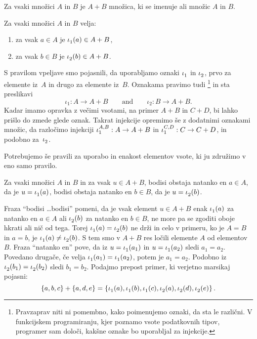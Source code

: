 \begin{pravilo}[Vsota]
  \label{vsota:tvorba}
  Za vsaki množici $A$ in $B$ je $A + B$ množica, ki se imenuje  ali
   množic $A$ in $B$.
\end{pravilo}

\begin{pravilo}
  \label{vsota:vpeljava}
  Za vsaki množici $A$ in $B$ velja:
  \begin{enumerate}
  \item za vsak $a \in A$ je $\inl(a) \in A + B$,
  \item za vsak $b \in B$ je $\inr(b) \in A + B$.
  \end{enumerate}
\end{pravilo}

S pravilom vpeljave smo pojasnili, da uporabljamo oznaki $\inl$ in $\inr$, prvo za
elemente iz~$A$ in drugo za elemente iz~$B$. Oznakama pravimo tudi
\footnote{Pravzaprav niti ni pomembno, kako poimenujemo oznaki, da sta le
  različni. V funkcijskem programiranju, kjer poznamo vsote podatkovnih tipov, programer
  sam določi, kakšne oznake bo uporabljal za injekcije.} in sta preslikavi
%
\begin{equation*}
  \iota_1 : A \to A + B
  \qquad\text{and}\qquad
  \iota_2 : B \to A + B.
\end{equation*}
%
Kadar imamo opravka z večimi vsotami, na primer $A + B$ in $C + D$, bi lahko prišlo do
zmede glede oznak. Takrat injekcije opremimo še z dodatnimi oznakami množic, da razločimo
injekciji $\inl[A][B] : A \to A + B$ in $\inl[C][D] : C \to C + D$, in podobno za~$\inr$.

Potrebujemo še pravili za uporabo in enakost elementov vsote, ki ju združimo v eno samo
pravilo.

\begin{pravilo}
  \label{vsota:uporaba}
  Za vsaki množici $A$ in $B$ in za vsak $u \in A + B$, bodisi obstaja natanko en
  $a \in A$, da je $u = \inl(a)$, bodisi obstaja natanko en $b \in B$, da je
  $u = \inr(b)$.
\end{pravilo}

Fraza ``bodisi \dots bodisi'' pomeni, da je vsak element $u \in A + B$ enak $\inl(a)$
za natanko en $a \in A$ ali $\inr(b)$ za natanko en $b \in B$, ne more pa se zgoditi oboje
hkrati ali nič od tega. Torej $\inl(a) = \inr(b)$ ne drži in celo v primeru, ko je
$A = B$ in $a = b$, je $\inl(a) \neq \inr(b)$. S tem smo v $A + B$ res ločili elemente $A$
od elementov $B$.
%
Fraza ``natanko en'' pove, da iz $u = \inl(a_1)$ in $u = \inl(a_2)$ sledi $a_1 = a_2$.
Povedano drugače, če velja $\inl(a_1) = \inl(a_2)$, potem je $a_1 = a_2$. Podobno iz
$\inr(b_1) = \inr(b_2)$ sledi $b_1 = b_2$.
%
Podajmo prepost primer, ki verjetno marsikaj pojasni:
%
\begin{equation*}
  \set{a, b, c} + \set{a, d, e} =
  \set{\inl(a), \inl(b), \inl(c), \inr(a), \inr(d), \inr(e)}.
\end{equation*}

